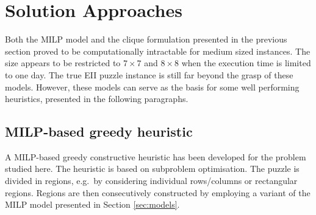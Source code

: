 \documentclass[preprint,12pt]{elsarticle}
\begin{document}
{\section{Solution Approaches}
\label{sec:e2solutionapproach}

\noindent
Both the MILP model and the clique formulation presented in the previous section proved to be computationally intractable for medium sized instances. The size appears to be restricted to $7\times7$ and $8\times8$ when the execution time is limited to one day. The true EII puzzle instance is still far beyond the grasp of these models.
However, these models can serve as the basis for some well performing heuristics, presented in the following paragraphs.

\subsection{MILP-based greedy heuristic}
\label{subsec:MilpGreedy}

\noindent
A MILP-based greedy constructive heuristic has been developed for the problem studied here.
The heuristic is based on subproblem optimisation.
The puzzle is divided in regions, e.g.\ by considering individual rows/columns or rectangular regions.
Regions are then consecutively constructed by employing a variant of the MILP model presented in Section \ref{sec:models}.

}
\end{document}
